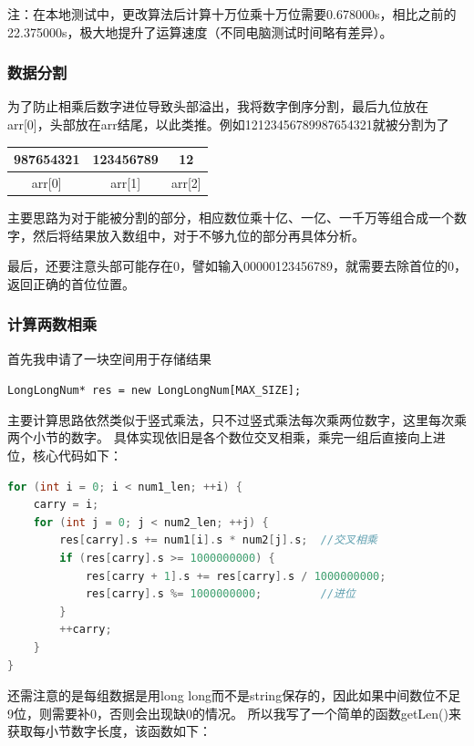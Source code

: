 \documentclass[a4paper, 11pt, UTF8]{ctexart}
\begin{document}
注：在本地测试中，更改算法后计算十万位乘十万位需要0.678000s，相比之前的22.375000s，极大地提升了运算速度（不同电脑测试时间略有差异）。

\subsubsection{数据分割}

为了防止相乘后数字进位导致头部溢出，我将数字倒序分割，最后九位放在arr[0]，头部放在arr结尾，以此类推。例如12123456789987654321就被分割为了
\begin{table}[H]
    \centering
    \begin{tabular}{ccc}
        \hline
        \multicolumn{1}{|c|}{987654321} & \multicolumn{1}{c|}{123456789} & \multicolumn{1}{c|}{12} \\ \hline
        arr{[}0{]}                      & arr{[}1{]}                     & arr{[}2{]}
    \end{tabular}
\end{table}

主要思路为对于能被分割的部分，相应数位乘十亿、一亿、一千万等组合成一个数字，然后将结果放入数组中，对于不够九位的部分再具体分析。

最后，还要注意头部可能存在0，譬如输入00000123456789，就需要去除首位的0，返回正确的首位位置。

\subsubsection{计算两数相乘}

首先我申请了一块空间用于存储结果

\verb|LongLongNum* res = new LongLongNum[MAX_SIZE];|

主要计算思路依然类似于竖式乘法，只不过竖式乘法每次乘两位数字，这里每次乘两个小节的数字。
具体实现依旧是各个数位交叉相乘，乘完一组后直接向上进位，核心代码如下：

\begin{lstlisting}[language=C++, basicstyle=\ttfamily]
 for (int i = 0; i < num1_len; ++i) {
    carry = i;
    for (int j = 0; j < num2_len; ++j) {
        res[carry].s += num1[i].s * num2[j].s;  //交叉相乘
        if (res[carry].s >= 1000000000) {
            res[carry + 1].s += res[carry].s / 1000000000;
            res[carry].s %= 1000000000;         //进位
        }
        ++carry;
    }
}
\end{lstlisting}

还需注意的是每组数据是用long long而不是string保存的，因此如果中间数位不足9位，则需要补0，否则会出现缺0的情况。
所以我写了一个简单的函数getLen()来获取每小节数字长度，该函数如下：
\end{document}
